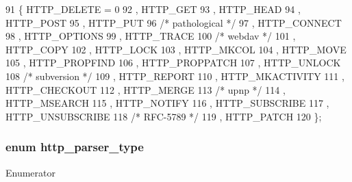 \begin{DoxyCode}
91   \{ HTTP_DELETE    = 0
92   , HTTP_GET
93   , HTTP_HEAD
94   , HTTP_POST
95   , HTTP_PUT
96   \textcolor{comment}{/* pathological */}
97   , HTTP_CONNECT
98   , HTTP_OPTIONS
99   , HTTP_TRACE
100   \textcolor{comment}{/* webdav */}
101   , HTTP_COPY
102   , HTTP_LOCK
103   , HTTP_MKCOL
104   , HTTP_MOVE
105   , HTTP_PROPFIND
106   , HTTP_PROPPATCH
107   , HTTP_UNLOCK
108   \textcolor{comment}{/* subversion */}
109   , HTTP_REPORT
110   , HTTP_MKACTIVITY
111   , HTTP_CHECKOUT
112   , HTTP_MERGE
113   \textcolor{comment}{/* upnp */}
114   , HTTP_MSEARCH
115   , HTTP_NOTIFY
116   , HTTP_SUBSCRIBE
117   , HTTP_UNSUBSCRIBE
118   \textcolor{comment}{/* RFC-5789 */}
119   , HTTP_PATCH
120   \};
\end{DoxyCode}
\subsubsection[{http\+\_\+parser\+\_\+type}]{\setlength{\rightskip}{0pt plus 5cm}enum {\bf http\+\_\+parser\+\_\+type}}\label{http__parser_8h_af9d6d304f8c255158175951b434cfa7a}
\begin{Desc}
\item[Enumerator]\par
\begin{description}
\item[{\em 
H\+T\+T\+P\+\_\+\+R\+E\+Q\+U\+E\+ST\label{http__parser_8h_af9d6d304f8c255158175951b434cfa7aa9f727b57e9e9c1651ee0df29aa1b1713}
}]\item[{\em 
H\+T\+T\+P\+\_\+\+R\+E\+S\+P\+O\+N\+SE\label{http__parser_8h_af9d6d304f8c255158175951b434cfa7aa132597b93208763e8e81c4a4a0e8a642}
}]\item[{\em 
H\+T\+T\+P\+\_\+\+B\+O\+TH\label{http__parser_8h_af9d6d304f8c255158175951b434cfa7aadac18fbd072752213fd5308bb5fc8684}
}]\end{description}
\end{Desc}


